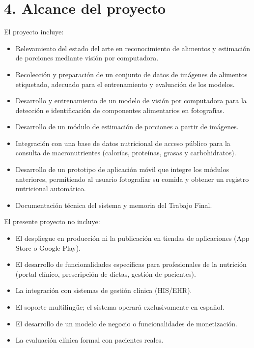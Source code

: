 \documentclass[
11pt, %
]{charter}
\begin{document}
\section{4. Alcance del proyecto}
\label{sec:alcance}

El proyecto incluye:

\begin{itemize}
	\item Relevamiento del estado del arte en reconocimiento de alimentos y estimación de porciones mediante visión por computadora.
	\item Recolección y preparación de un conjunto de datos de imágenes de alimentos etiquetado, adecuado para el entrenamiento y evaluación de los modelos.
	\item Desarrollo y entrenamiento de un modelo de visión por computadora para la detección e identificación de componentes alimentarios en fotografías.
	\item Desarrollo de un módulo de estimación de porciones a partir de imágenes.
	\item Integración con una base de datos nutricional de acceso público para la consulta de macronutrientes (calorías, proteínas, grasas y carbohidratos).
	\item Desarrollo de un prototipo de aplicación móvil que integre los módulos anteriores, permitiendo al usuario fotografiar su comida y obtener un registro nutricional automático.
	\item Documentación técnica del sistema y memoria del Trabajo Final.
\end{itemize}

El presente proyecto no incluye:

\begin{itemize}
	\item El despliegue en producción ni la publicación en tiendas de aplicaciones (App Store o Google Play).
	\item El desarrollo de funcionalidades específicas para profesionales de la nutrición (portal clínico, prescripción de dietas, gestión de pacientes).
	\item La integración con sistemas de gestión clínica (HIS/EHR).
	\item El soporte multilingüe; el sistema operará exclusivamente en español.
	\item El desarrollo de un modelo de negocio o funcionalidades de monetización.
	\item La evaluación clínica formal con pacientes reales.
\end{itemize}
\end{document}
